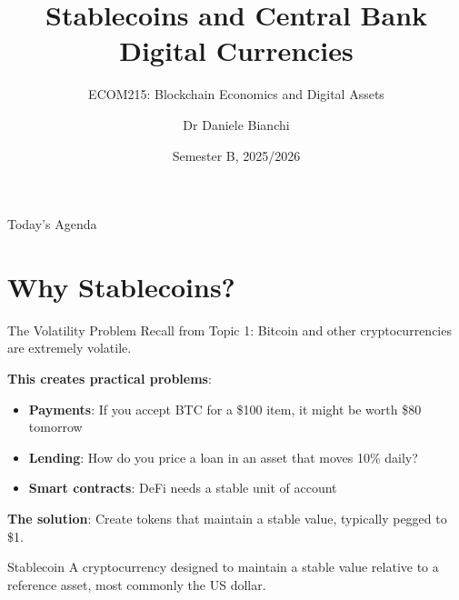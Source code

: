 \documentclass[10pt]{beamer}
\title{Stablecoins and Central Bank Digital Currencies}
\subtitle{ECOM215: Blockchain Economics and Digital Assets}
\author{Dr Daniele Bianchi}
\institute{Queen Mary, University of London}
\date{Semester B, 2025/2026}
\begin{document}
\AtBeginSection[]{
  \begin{frame}[plain]
    \vfill
    \begin{center}
      {\Large\color{ImperialBlue}\insertsection}
    \end{center}
    \vfill
  \end{frame}
}

\begin{frame}[plain]
  \titlepage
\end{frame}

\begin{frame}{Today's Agenda}
  \tableofcontents
\end{frame}

\section{Why Stablecoins?}

\begin{frame}{The Volatility Problem}
  Recall from Topic 1: Bitcoin and other cryptocurrencies are extremely volatile.
  
  \vspace{1em}
  \textbf{This creates practical problems}:
  \begin{itemize}
    \item \textbf{Payments}: If you accept BTC for a \$100 item, it might be worth \$80 tomorrow
    \item \textbf{Lending}: How do you price a loan in an asset that moves 10\% daily?
    \item \textbf{Smart contracts}: DeFi needs a stable unit of account
  \end{itemize}
  
  \vspace{1em}
  \textbf{The solution}: Create tokens that maintain a stable value, typically pegged to \$1.
  
  \begin{block}{Stablecoin}
    A cryptocurrency designed to maintain a stable value relative to a reference asset, most commonly the US dollar.
  \end{block}
\end{frame}
\end{document}

